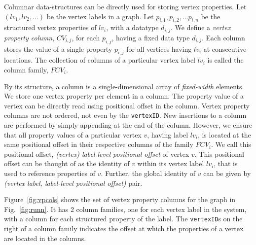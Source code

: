 Columnar data-structures can be directly used for storing vertex properties. Let $(lv_1, lv_2, ...)$ be the vertex labels in a graph. Let $p_{i,1},  p_{i,2}, ... p_{i, n}$ be the structured vertex properties of $lv_i$, with a datatype $d_{i,j}$. We define a \emph{vertex property column}, $CV_{i,j}$, for each $p_{i,j}$, having a fixed data type $d_{i,j}$. Each column stores the value of a single property $p_{i,j}$ for all vertices having $lv_i$ at consecutive locations. The collection of columns of a particular vertex label $lv_i$ is called the column family, $FCV_i$. 

By its structure, a column is a single-dimensional array of \emph{fixed-width} elements. We store one vertex property per element in a column. The property value of a vertex can be directly read using positional offset in the column. Vertex property columns are not ordered, not even by the \texttt{vertexID}. New insertions to a column are performed by simply appending at the end of the column. However, we ensure that all property values of a particular vertex $v$, having label $lv_i$, is located at the same positional offset in their respective columns of the family $FCV_i$. We call this positional offset, \emph{(vertex) label-level positional offset} of vertex $v$. This positional offset can be thought of as the identity of $v$ within its vertex label $lv_i$, that is used to reference properties of $v$. Further, the global identity of $v$ can be given by \textit{(vertex label, label-level positional offset)} pair. 

Figure~\ref{fig:vpcols} shows the set of vertex property columns for the graph in Fig.~\ref{fig:runn}. It has 2 column families, one for each vertex label in the system, with a column for each structured property of the label. The \texttt{vertexID}s on the right of a column family indicates the offset at which the properties of a vertex are located in the columns.

